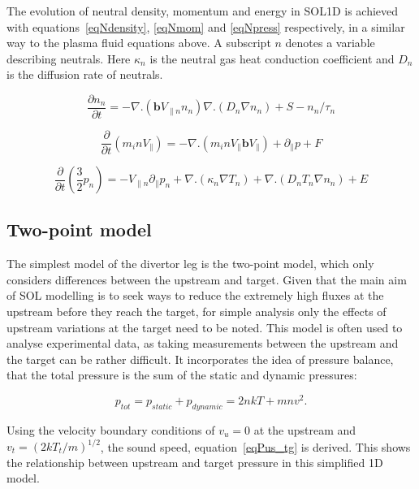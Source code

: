 \documentclass[12pt]{article}  %
\begin{document}
The evolution of neutral density, momentum and energy in SOL1D is achieved with equations~\ref{eqNdensity}, \ref{eqNmom} and \ref{eqNpress} respectively, in a similar way to the plasma fluid equations above. A subscript $n$ denotes a variable describing neutrals. Here $\kappa_n$ is the neutral gas heat conduction coefficient and $D_n$ is the diffusion rate of neutrals.

  \begin{equation}\label{eqNdensity}
  \frac{\partial n_n}{\partial t} = -\nabla.(\textbf{b} V_{\parallel n} n_n) \nabla.(D_n \nabla n_n) + S - n_n/\tau_n
  \end{equation}
  
  \begin{equation}\label{eqNmom}
  \frac{\partial}{\partial t}(m_i n V_{\parallel}) = -\nabla . (m_i n V_{\parallel} \textbf{b} V_{\parallel}) + \partial_{\parallel}p + F
  \end{equation}
  
  \begin{equation}\label{eqNpress}
  \frac{\partial}{\partial t}\left( \frac{3}{2}p_n\right)  = -V_{\parallel n} \partial_{\parallel}p_n + \nabla.(\kappa_n \nabla T_n) + \nabla.(D_n T_n \nabla n_n)+ E
  \end{equation}


\subsection{Two-point model}\label{ssec2PT}
The simplest model of the divertor leg is the two-point model, which only considers differences between the upstream and target. Given that the main aim of SOL modelling is to seek ways to reduce the extremely high fluxes at the upstream before they reach the target, for simple analysis only the effects of upstream variations at the target need to be noted. This model is often used to analyse experimental data, as taking measurements between the upstream and the target can be rather difficult. It incorporates the idea of pressure balance, that the total pressure is the sum of the static and dynamic pressures:

  \begin{equation}\label{eqPbal}
  p_{tot} = p_{static} + p_{dynamic} = 2nkT + mnv^2.
  \end{equation}

Using the velocity boundary conditions of $ v_u=0 $ at the upstream and $ v_t=(2kT_t/m)^{1/2} $, the sound speed, equation~\ref{eqPus_tg} is derived. This shows the relationship between upstream and target pressure in this simplified 1D model.
\end{document}
